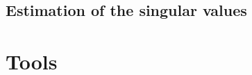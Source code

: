 \documentclass[10pt]{article}
\newcommand{\cL}{\mathcal{L}}
\newcommand{\e}{\mathrm{e}}
\newcommand{\1}{\mathbbm 1}
\newtheorem{definition}{Definition}
\begin{document}
        \subsection{Estimation of the singular values}

    \section{Tools}


\end{document}
